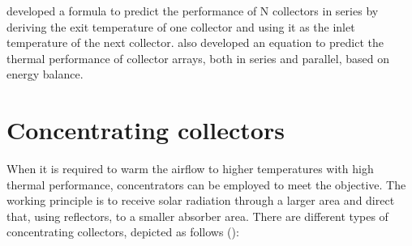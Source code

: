 \citet{Oonk1979} developed a formula to predict the performance of N collectors in series by deriving the exit temperature of one collector and using it as the inlet temperature of the next collector. \citet{Fanney1981} also developed an equation to predict the thermal performance of collector arrays, both in series and parallel, based on energy balance.

\section{Concentrating collectors}

When it is required to warm the airflow to higher temperatures with high thermal performance, concentrators can be employed to meet the objective. The working principle is to receive solar radiation through a larger area and direct that, using reflectors, to a smaller absorber area. There are different types of concentrating collectors, depicted as follows (\cite{Evangelisti2019}): 

